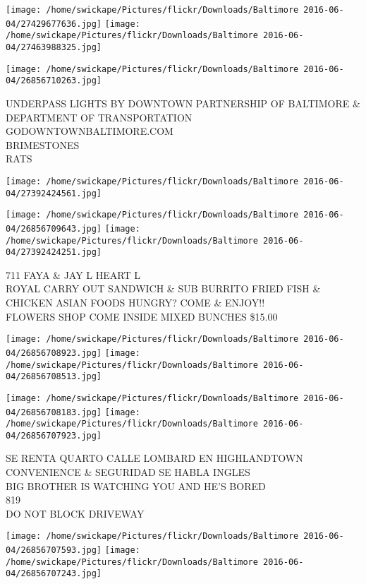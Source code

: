\documentclass[10pt,letterpaper]{article}
\begin{document}
\texttt{[image: /home/swickape/Pictures/flickr/Downloads/Baltimore 2016-06-04/27429677636.jpg]}
\texttt{[image: /home/swickape/Pictures/flickr/Downloads/Baltimore 2016-06-04/27463988325.jpg]}

\texttt{[image: /home/swickape/Pictures/flickr/Downloads/Baltimore 2016-06-04/26856710263.jpg]}

UNDERPASS LIGHTS BY DOWNTOWN PARTNERSHIP OF BALTIMORE \& DEPARTMENT OF TRANSPORTATION GODOWNTOWNBALTIMORE.COM\\
BRIMESTONES\\
RATS\\
\pagebreak

\texttt{[image: /home/swickape/Pictures/flickr/Downloads/Baltimore 2016-06-04/27392424561.jpg]}

\vspace{0.25in}
\texttt{[image: /home/swickape/Pictures/flickr/Downloads/Baltimore 2016-06-04/26856709643.jpg]}
\texttt{[image: /home/swickape/Pictures/flickr/Downloads/Baltimore 2016-06-04/27392424251.jpg]}

711 FAYA \& JAY L HEART L\\
ROYAL CARRY OUT SANDWICH \& SUB BURRITO FRIED FISH \& CHICKEN ASIAN FOODS HUNGRY?  COME \& ENJOY!!\\
FLOWERS SHOP COME INSIDE MIXED BUNCHES \$15.00\\
\pagebreak

\texttt{[image: /home/swickape/Pictures/flickr/Downloads/Baltimore 2016-06-04/26856708923.jpg]}
\texttt{[image: /home/swickape/Pictures/flickr/Downloads/Baltimore 2016-06-04/26856708513.jpg]}

\texttt{[image: /home/swickape/Pictures/flickr/Downloads/Baltimore 2016-06-04/26856708183.jpg]}
\texttt{[image: /home/swickape/Pictures/flickr/Downloads/Baltimore 2016-06-04/26856707923.jpg]}

SE RENTA QUARTO CALLE LOMBARD EN HIGHLANDTOWN CONVENIENCE \& SEGURIDAD SE HABLA INGLES\\
BIG BROTHER IS WATCHING YOU AND HE'S BORED\\
819\\
DO NOT BLOCK DRIVEWAY\\
\pagebreak

\texttt{[image: /home/swickape/Pictures/flickr/Downloads/Baltimore 2016-06-04/26856707593.jpg]}
\texttt{[image: /home/swickape/Pictures/flickr/Downloads/Baltimore 2016-06-04/26856707243.jpg]}
\end{document}
